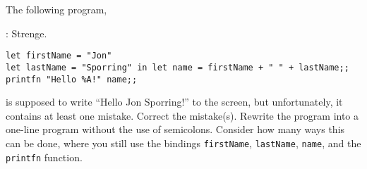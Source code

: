 The following program,
\begin{codeNOutput}{: Strenge.}
  \begin{lstlisting}
let firstName = "Jon"
let lastName = "Sporring" in let name = firstName + " " + lastName;;
printfn "Hello %A!" name;;
  \end{lstlisting}
\end{codeNOutput}
is supposed to write ``Hello Jon Sporring!'' to the screen, but
unfortunately, it contains at least one mistake. Correct the
mistake(s). Rewrite the program into a one-line program without the
use of semicolons. Consider how many ways this can be done, where you
still use the bindings \lstinline!firstName!, \lstinline!lastName!,
\lstinline!name!, and the \lstinline!printfn! function. 
